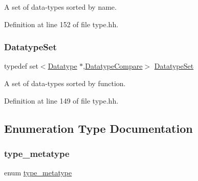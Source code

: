 A set of data-\/types sorted by name. 



Definition at line 152 of file type.\+hh.

\mbox{\label{type_8hh_a718b9f8902a3f2dcc61b4eb84c58adf2}} 
\subsubsection{\texorpdfstring{DatatypeSet}{DatatypeSet}}
{\footnotesize\ttfamily typedef set$<$\mbox{\hyperlink{class_datatype}{Datatype}} $\ast$,\mbox{\hyperlink{struct_datatype_compare}{Datatype\+Compare}}$>$ \mbox{\hyperlink{type_8hh_a718b9f8902a3f2dcc61b4eb84c58adf2}{Datatype\+Set}}}



A set of data-\/types sorted by function. 



Definition at line 149 of file type.\+hh.



\subsection{Enumeration Type Documentation}
\mbox{\label{type_8hh_aef6429f2523cdf4d415ba04a0209e61f}} 
\subsubsection{\texorpdfstring{type\_metatype}{type\_metatype}}
{\footnotesize\ttfamily enum \mbox{\hyperlink{type_8hh_aef6429f2523cdf4d415ba04a0209e61f}{type\+\_\+metatype}}}

